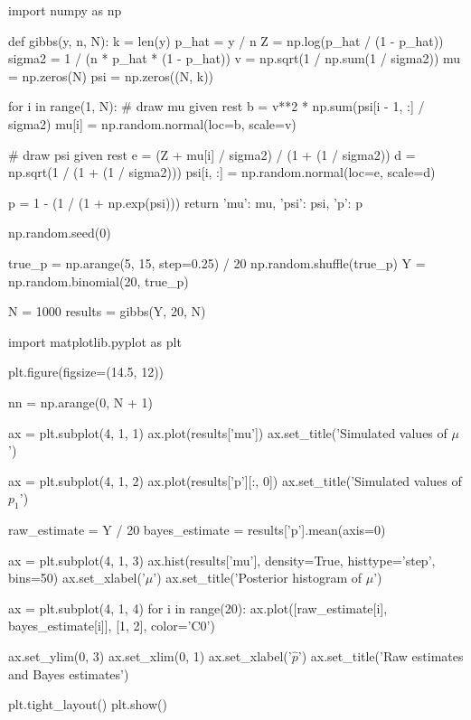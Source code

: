 \begin{python}
import numpy as np

def gibbs(y, n, N):
    k = len(y)
    p_hat = y / n
    Z = np.log(p_hat / (1 - p_hat))
    sigma2 = 1 / (n * p_hat * (1 - p_hat))
    v = np.sqrt(1 / np.sum(1 / sigma2))
    mu = np.zeros(N)
    psi = np.zeros((N, k))
    
    for i in range(1, N):
        # draw mu given rest
        b = v**2 * np.sum(psi[i - 1, :] / sigma2)
        mu[i] = np.random.normal(loc=b, scale=v)
        
        # draw psi given rest
        e = (Z + mu[i] / sigma2) / (1 + (1 / sigma2))
        d = np.sqrt(1 / (1 + (1 / sigma2)))
        psi[i, :] = np.random.normal(loc=e, scale=d)
        
    p = 1 - (1 / (1 + np.exp(psi)))
    return {
        'mu': mu,
        'psi': psi,
        'p': p
    }
\end{python}

\begin{python}
np.random.seed(0)

true_p = np.arange(5, 15, step=0.25) / 20
np.random.shuffle(true_p)
Y = np.random.binomial(20, true_p)

N = 1000
results = gibbs(Y, 20, N)
\end{python}

\begin{python}
import matplotlib.pyplot as plt

plt.figure(figsize=(14.5, 12))

nn = np.arange(0, N + 1)

ax = plt.subplot(4, 1, 1)
ax.plot(results['mu'])
ax.set_title('Simulated values of $\mu$')

ax = plt.subplot(4, 1, 2)
ax.plot(results['p'][:, 0])
ax.set_title('Simulated values of $p_1$')


raw_estimate = Y / 20
bayes_estimate = results['p'].mean(axis=0)

ax = plt.subplot(4, 1, 3)
ax.hist(results['mu'], density=True, histtype='step', bins=50)
ax.set_xlabel('$\mu$')
ax.set_title('Posterior histogram of $\mu$')

ax = plt.subplot(4, 1, 4)
for i in range(20):
    ax.plot([raw_estimate[i], bayes_estimate[i]], [1, 2], color='C0')
    
ax.set_ylim(0, 3)
ax.set_xlim(0, 1)
ax.set_xlabel('$\hat{p}$')
ax.set_title('Raw estimates and Bayes estimates')

plt.tight_layout()
plt.show()
\end{python}

